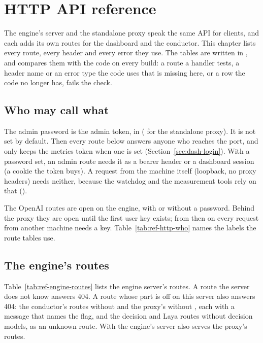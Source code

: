 \chapter{HTTP API reference}\label{ch:ref-http}

The engine's server and the standalone proxy speak the same API for clients, and each adds its own routes for the dashboard and the conductor. This chapter lists every route, every header and every error they use. The tables are written in , and  compares them with the code on every build: a route a handler tests, a header name or an error type the code uses that is missing here, or a row the code no longer has, fails the check.

\section{Who may call what}

The admin password is the admin token,  in  ( for the standalone proxy). It is not set by default. Then every route below answers anyone who reaches the port, and only  keeps the metrics token when one is set (Section~\ref{sec:dash-login}). With a password set, an admin route needs it as a bearer header or a dashboard session (a cookie the token buys). A request from the machine itself (loopback, no proxy headers) needs neither, because the watchdog and the measurement tools rely on that ().

The OpenAI routes are open on the engine, with or without a password. Behind the proxy they are open until the first user key exists; from then on every request from another machine needs a key. Table~\ref{tab:ref-http-who} names the labels the route tables use.



\section{The engine's routes}

Table~\ref{tab:ref-engine-routes} lists the engine server's routes. A route the server does not know answers 404. A route whose part is off on this server also answers 404: the conductor's routes without  and the proxy's without , each with a message that names the flag, and the decision and Laya routes without decision models, as an unknown route. With  the engine's server also serves the proxy's routes.

